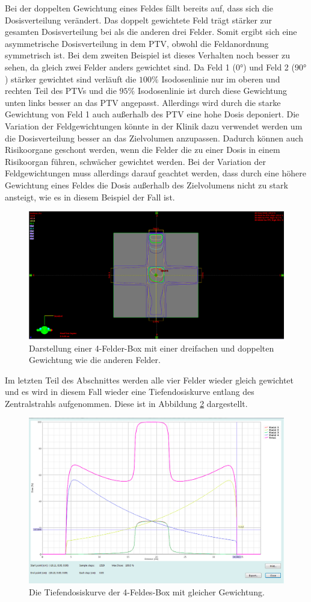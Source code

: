 Bei der doppelten Gewichtung eines Feldes fällt bereits auf, dass sich die Dosisverteilung
verändert. Das doppelt gewichtete Feld trägt stärker zur gesamten Dosisverteilung bei
als die anderen drei Felder. Somit ergibt sich eine asymmetrische Dosisverteilung
in dem PTV, obwohl die Feldanordnung symmetrisch ist.
Bei dem zweiten Beispiel ist dieses Verhalten noch besser zu sehen, da gleich zwei
Felder anders gewichtet sind. Da Feld 1 ($0°$) und Feld 2 ($90°$) stärker gewichtet
sind verläuft die $100\%$ Isodosenlinie nur im oberen und rechten Teil des PTVs
und die $95\%$ Isodosenlinie ist durch diese Gewichtung unten links besser an das PTV
angepasst. Allerdings wird durch die starke Gewichtung von Feld 1 auch außerhalb
des PTV eine hohe Dosis deponiert.
Die Variation der Feldgewichtungen könnte in der Klinik dazu verwendet werden um die
Dosisverteilung besser an das Zielvolumen anzupassen. Dadurch können auch Risikoorgane
geschont werden, wenn die Felder die zu einer Dosis in einem Risikoorgan führen,
schwächer gewichtet werden.
Bei der Variation der Feldgewichtungen muss allerdings darauf geachtet werden, dass
durch eine höhere Gewichtung eines Feldes die Dosis außerhalb des Zielvolumens nicht
zu stark ansteigt, wie es in diesem Beispiel der Fall ist.

\begin{figure}[H]
	\centering
	\includegraphics[width=0.7\linewidth]{../../Wasserphantom Bilder/Aufgabe223}
	\caption{Darstellung einer 4-Felder-Box mit einer dreifachen und doppelten Gewichtung wie die anderen Felder.}
	\label{fig:aufgabe223}
\end{figure}

Im letzten Teil des Abschnittes werden alle vier Felder wieder gleich gewichtet und es wird in diesem Fall wieder eine Tiefendosiskurve entlang des Zentralstrahls aufgenommen.
Diese ist in Abbildung \ref{fig:aufgabe224} dargestellt.

\begin{figure}[H]
	\centering
	\includegraphics[width=0.7\linewidth]{../../Wasserphantom Bilder/Aufgabe224.png}
	\caption{Die Tiefendosiskurve der 4-Feldes-Box mit gleicher Gewichtung.}
	\label{fig:aufgabe224}
\end{figure}


